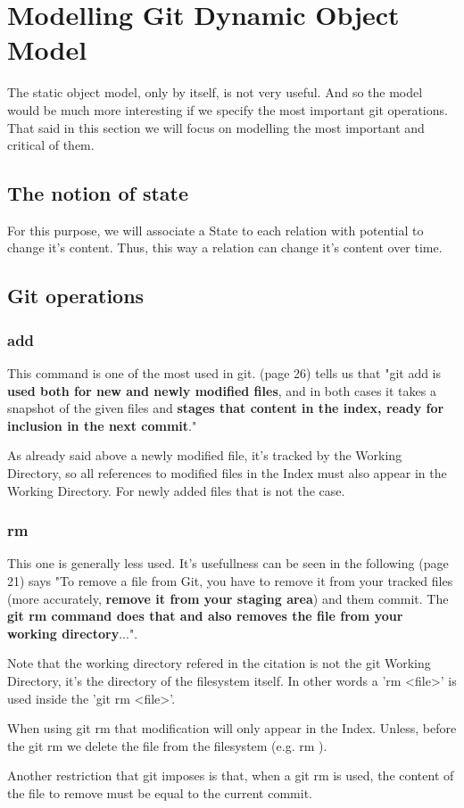 \section {Modelling Git Dynamic Object Model}

The static object model, only by itself, 
is not very useful. And so
the model would be much more interesting if we specify 
the most important git operations. That said in this
section we will focus on modelling the most important
and critical of them. \par

\subsection{The notion of state}
For this purpose, we will associate a State to each relation
with potential to change it's content. Thus, this way a relation
can change it's content over time.

\subsection{Git operations}

\subsubsection{add}

This command is one of the most used in git. \cite{gitComm} (page 26)
tells us that
"git add is {\bf used both for new and newly modified files},
and in both cases it takes a snapshot of the given files
and {\bf stages that content in the index, ready for inclusion
in the next commit}." \par 
As already said above a newly modified file, it's tracked by
the Working Directory, so all references to modified files in
the Index must also appear in the Working Directory. For newly
added files that is not the case.

\subsubsection{rm}

This one is generally less used. It's usefullness can be
seen in the following \cite{progit}
(page 21) says "To remove a file from Git, you have to remove it
from your tracked files (more accurately, {\bf remove it from your
staging area}) and them commit. The {\bf git rm command does that
and also removes the file from your working directory}...". \par
Note that the working directory refered in the citation is not
the git Working Directory, it's the directory of the filesystem itself.
In other words a 'rm <file>' is used inside the 'git rm <file>'. \par
When using git rm
that modification will only appear in the Index. Unless, before
the git rm we delete the file from the filesystem (e.g. rm ). \par
Another restriction that git imposes is that, when a git rm is used, the
content of the file to remove must be equal to the current commit. \par


